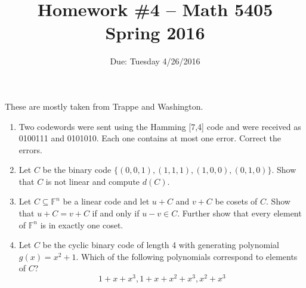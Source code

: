 \documentclass[11pt]{amsart}
\begin{document}
\title{Homework \#4 -- Math 5405\\Spring 2016}
\author{Due: Tuesday  4/26/2016}
\maketitle
These are mostly taken from Trappe and Washington.
\begin{enumerate}
\item Two codewords were sent using the Hamming [7,4] code and were received as 0100111 and 0101010.  Each one contains at most one error.  Correct the errors.
\item Let $C$ be the binary code $\{ (0,0,1), (1,1,1), (1,0,0), (0,1,0)\}$.  Show that $C$ is not linear and compute $d(C)$.
\item Let $C \subseteq \mathbb{F}^n$ be a linear code and let $u + C$ and $v + C$ be cosets of $C$.  Show that $u + C = v + C$ if and only if $u - v \in C$.  Further show that every element of $\mathbb{F}^n$ is in exactly one coset.  
\item Let $C$ be the cyclic binary code of length 4 with generating polynomial $g(x) = x^2 + 1$.  Which of the following polynomials correspond to elements of $C$?
\[
1+x+x^3, 1+x+x^2+x^3, x^2 + x^3
\]
\end{enumerate}
\end{document}
